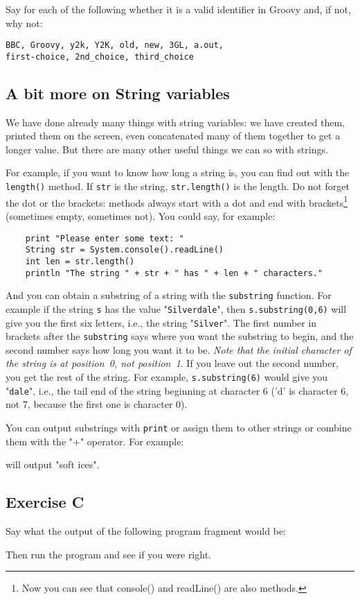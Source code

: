 Say for each of the following whether it is a valid identifier
in Groovy and, if not, why not:
\begin{Verbatim}
BBC, Groovy, y2k, Y2K, old, new, 3GL, a.out, 
first-choice, 2nd_choice, third_choice
\end{Verbatim}

\subsection{A bit more on String variables}

We have done already many things with string variables: we have
created them, printed them on the screen, even concatenated many of
them together to get a longer value. But there are many other useful
things we can so with strings. 

For example, if you want to know how long a string is, you can find
out with the \verb!length()! 
method. If  \verb!str! is the string, \verb!str.length()! is the
length. Do not forget the dot or the brackets: methods always start
with a dot and end with brackets\footnote{Now you can see that
  console() and readLine() are also methods.} (sometimes empty,
sometimes not). You could say, for example:

\begin{Verbatim}
    print "Please enter some text: "
    String str = System.console().readLine()
    int len = str.length()
    println "The string " + str + " has " + len + " characters."
\end{Verbatim}

And you can obtain a substring of a string with the \verb!substring! function.
For example if the string \verb!s! has the value "\verb!Silverdale!", then
\verb!s.substring(0,6)! will give you the first six letters, i.e., the string
"\verb!Silver!".  The first number in brackets after the \verb!substring!
says where you want the substring to begin, and the second number says how
long you want it to be. \emph{Note that the initial character of the string
is at position~0, not position~1}.  If you leave out the second number,
you get the rest of the string.  For example, \verb!s.substring(6)! would
give you "\verb!dale!", i.e., the tail end of the string beginning at
character 6 ('d' is character 6, not 7, because the first one is
character 0). 

You can output substrings with \verb!print! or assign them to other
strings or combine them with the "+" operator.  For example:


will output "soft ices".

\subsection*{Exercise C}

Say what the output of the following program fragment would be:


Then run the program and see if you were right. 


